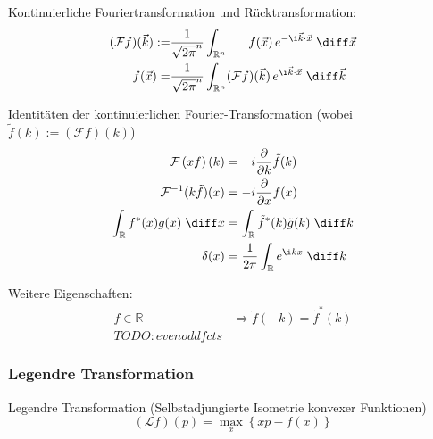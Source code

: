 \documentclass[11pt]{article}
\numberwithin{equation}{section}
\begin{document}
        Kontinuierliche Fouriertransformation und Rücktransformation:
        \begin{equation}
          \begin{aligned}
            (\mathcal{F}f)(\vec{k}) :=& \frac{1}{\sqrt{2\pi}^n}\int_{\mathbb{R}^n} \phantom{(\mathcal{F})}f(\vec{x})\, e^{-\i\vec{k}\cdot\vec{x}}\;\diff\vec{x} \\
            \phantom{(\mathcal{F})}f(\vec{x}) =& \frac{1}{\sqrt{2\pi}^n}\int_{\mathbb{R}^n} (\mathcal{F}f)(\vec{k}) \,e^{\i\vec{k}\cdot\vec{x}}\;\diff \vec{k} \\
          \end{aligned}
        \end{equation}

        Identitäten der kontinuierlichen Fourier-Transformation (wobei $\tilde{f}(k) := \left(\mathcal{F}f\right)(k)$)
        \begin{equation}
          \begin{aligned}
            \mathcal{F}\left(xf\right)(k) &= \phantom{-}i \pder{}{k}\tilde{f}(k) \\
            \mathcal{F}^{-1}(k\tilde{f})(x) &= -i\pder{}{x}f(x) \\
            \int_{\mathbb{R}} f^{*}(x) g(x)\;\diff x &=
            \int_{\mathbb{R}}\tilde{f}^{*}(k)\tilde{g}(k)\;\diff k \\
            \delta(x) &= \frac{1}{2\pi}\int_{\mathbb{R}}e^{\i kx}\;\diff k \\
            \label{eq:fourierIdentities}
          \end{aligned}
        \end{equation}

        Weitere Eigenschaften:
        \begin{equation}
          \begin{aligned}
            f\in\mathbb{R}
            &\Rightarrow \tilde{f}(-k)=\tilde{f}^*(k) \\
            TODO: even odd fcts
          \end{aligned}
        \end{equation}

      \subsubsection{Legendre Transformation}
        Legendre Transformation (Selbstadjungierte Isometrie konvexer Funktionen)
        \begin{equation}
          (\mathcal{L}f)(p)=\max_x\left\lbrace xp-f(x) \right\rbrace
        \end{equation}
\end{document}
